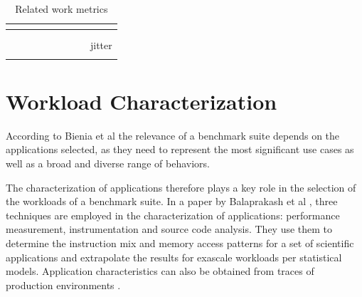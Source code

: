 \documentclass[ppgc,diss,english]{iiufrgs}
\begin{document}
\begin{table}[t]
\begin{center}
\begin{tabular}{ | l | c | c | c | >{\centering\arraybackslash}p{0.5cm} | c | >{\centering\arraybackslash}p{0.7cm} | >{\centering\arraybackslash}p{0.7cm} | >{\centering\arraybackslash}p{1.5cm} |}
		\cite{yahoo2015bench} &  & \textbullet & \textbullet & & & & & \\\hline
		\cite{wang2014bigdatabench} &  &  & \textbullet & & & & & \\\hline
		\cite{wang2016stream} &  & \textbullet & \textbullet & & & & & \\\hline
		\cite{shukla2017riotbench} &  & \textbullet & \textbullet & & & \textbullet & & jitter\\\hline
		\cite{huang2010hibench} &  &  & \textbullet & & \textbullet & \textbullet & & \\\hline
		
	\end{tabular}
	\vspace{5px}
	\caption{Related work metrics}
	\label{table:related_work_metrics}
\end{center}
\end{table}

\section{Workload Characterization}
\label{sec:esp:workload_characterization}

According to Bienia et al \cite{bienia2008parsec} the relevance of a benchmark suite depends on the applications selected, as they need to represent the most significant use cases as well as a broad and diverse range of behaviors.

The characterization of applications therefore plays a key role in the selection of the workloads of a benchmark suite. In a paper by Balaprakash et al \cite{balaprakash2013exascale}, three techniques are employed in the characterization of applications: performance measurement, instrumentation and source code analysis. They use them to determine the instruction mix and memory access patterns for a set of scientific applications and extrapolate the results for exascale workloads per statistical models. Application characteristics can also be obtained from traces of production environments \cite{khan2012workload}.

\end{document}
